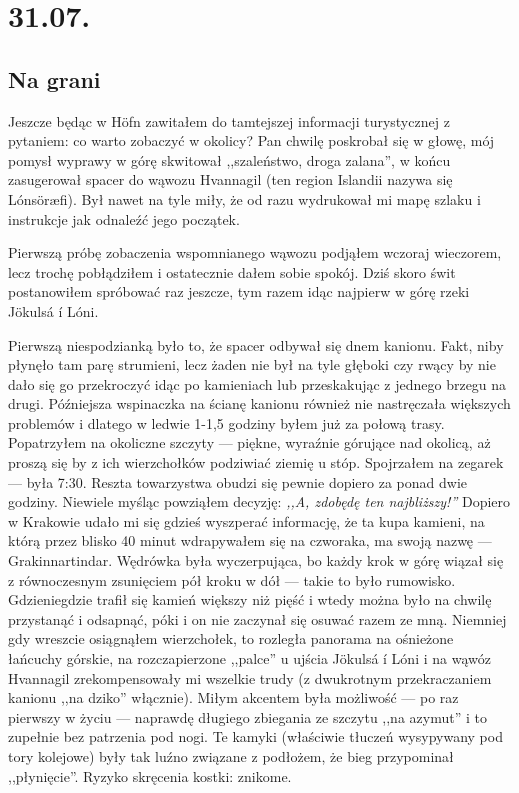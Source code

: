 \chapter*{31.07.}

\section*{Na grani}

Jeszcze będąc w Höfn zawitałem do tamtejszej informacji turystycznej z pytaniem: co warto zobaczyć w okolicy? Pan chwilę poskrobał się w głowę, mój pomysł wyprawy w górę  skwitował ,,szaleństwo, droga zalana'', w końcu zasugerował spacer do wąwozu Hvannagil (ten region Islandii nazywa się Lónsöræfi). Był nawet na tyle miły, że od razu wydrukował mi mapę szlaku i instrukcje jak odnaleźć jego początek.

Pierwszą próbę zobaczenia wspomnianego wąwozu podjąłem wczoraj wieczorem, lecz trochę pobłądziłem i ostatecznie dałem sobie spokój. Dziś skoro świt postanowiłem spróbować raz jeszcze, tym razem idąc najpierw w górę rzeki Jökulsá í Lóni.

Pierwszą niespodzianką było to, że spacer odbywał się dnem kanionu. Fakt, niby płynęło tam parę strumieni, lecz żaden nie był na tyle głęboki czy rwący by nie dało się go przekroczyć idąc po kamieniach lub przeskakując z jednego brzegu na drugi. Późniejsza wspinaczka na ścianę kanionu również nie nastręczała większych problemów i dlatego w ledwie 1-1,5 godziny byłem już za połową trasy. Popatrzyłem na okoliczne szczyty --- piękne, wyraźnie górujące nad okolicą, aż proszą się by z ich wierzchołków podziwiać ziemię u stóp. Spojrzałem na zegarek --- była 7:30. Reszta towarzystwa obudzi się pewnie dopiero za ponad dwie godziny. Niewiele myśląc powziąłem decyzję: \emph{,,A, zdobędę ten najbliższy!''} Dopiero w Krakowie udało mi się gdzieś wyszperać informację, że ta kupa kamieni, na którą przez blisko 40 minut wdrapywałem się na czworaka, ma swoją nazwę --- Grakinnartindar. Wędrówka była wyczerpująca, bo każdy krok w górę wiązał się z równoczesnym zsunięciem pół kroku w dół --- takie to było rumowisko. Gdzieniegdzie trafił się kamień większy niż pięść i wtedy można było na chwilę przystanąć i odsapnąć, póki i on nie zaczynał się osuwać razem ze mną. Niemniej gdy wreszcie osiągnąłem wierzchołek, to rozległa panorama na ośnieżone łańcuchy górskie, na rozczapierzone ,,palce'' u ujścia Jökulsá í Lóni i na wąwóz Hvannagil zrekompensowały mi wszelkie trudy (z dwukrotnym przekraczaniem kanionu ,,na dziko'' włącznie). Miłym akcentem była możliwość --- po raz pierwszy w życiu --- naprawdę długiego zbiegania ze szczytu ,,na azymut'' i to zupełnie bez patrzenia pod nogi. Te kamyki (właściwie tłuczeń wysypywany pod tory kolejowe) były tak luźno związane z podłożem, że bieg przypominał ,,płynięcie''. Ryzyko skręcenia kostki: znikome.

